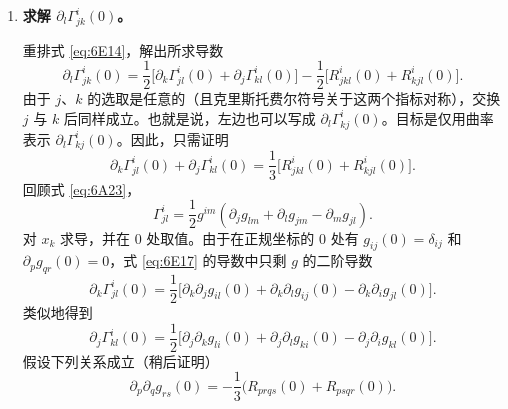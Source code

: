 \begin{enumerate}
由于克里斯托费尔符号关于下指标对称，即 $\Gamma^i_{jk}=\Gamma^i_{kj}$，它们对任一坐标的导数也对称
\[
  \partial_l\Gamma^i_{jk}(0)=\partial_l\Gamma^i_{kj}(0).
\]
因此式 \eqref{eq:6E13} 化为
\begin{equation*}
  R^i_{jkl}(0)+R^i_{kjl}(0)
   =\partial_k\Gamma^i_{jl}(0)+\partial_j\Gamma^i_{kl}(0)-2\partial_l\Gamma^i_{jk}(0).
  \tag{6E14}\label{eq:6E14}
\end{equation*}
\item \textbf{求解 $\partial_l\Gamma^i_{jk}(0)$。}

重排式 \eqref{eq:6E14}，解出所求导数
\begin{equation*}
  \partial_l\Gamma^i_{jk}(0)
   =\frac12\bigl[\partial_k\Gamma^i_{jl}(0)+\partial_j\Gamma^i_{kl}(0)\bigr]
      -\frac12\bigl[R^i_{jkl}(0)+R^i_{kjl}(0)\bigr].
  \tag{6E15}\label{eq:6E15}
\end{equation*}
由于 $j$、$k$ 的选取是任意的（且克里斯托费尔符号关于这两个指标对称），交换 $j$ 与 $k$ 后同样成立。也就是说，左边也可以写成 $\partial_l\Gamma^i_{kj}(0)$。目标是仅用曲率表示 $\partial_l\Gamma^i_{kj}(0)$。因此，只需证明
\begin{equation*}
  \partial_k\Gamma^i_{jl}(0)+\partial_j\Gamma^i_{kl}(0)
    =\frac13\bigl[R^i_{jkl}(0)+R^i_{kjl}(0)\bigr].
  \tag{6E16}\label{eq:6E16}
\end{equation*}
回顾式 \eqref{eq:6A23}，
\begin{equation*}
  \Gamma^i_{jl}=\frac12g^{im}(\partial_jg_{lm}+\partial_lg_{jm}-\partial_mg_{jl}).
  \tag{6E17}\label{eq:6E17}
\end{equation*}
对 $x_k$ 求导，并在 0 处取值。由于在正规坐标的 0 处有 $g_{ij}(0)=\delta_{ij}$ 和 $\partial_pg_{qr}(0)=0$，式 \eqref{eq:6E17} 的导数中只剩 $g$ 的二阶导数
\begin{equation*}
  \partial_k\Gamma^i_{jl}(0)=\frac12\bigl[\partial_k\partial_jg_{il}(0)
             +\partial_k\partial_lg_{ij}(0)-\partial_k\partial_i g_{jl}(0)\bigr].
  \tag{6E18}\label{eq:6E18}
\end{equation*}
类似地得到
\begin{equation*}
  \partial_j\Gamma^i_{kl}(0)=\frac12\bigl[\partial_j\partial_kg_{li}(0)
             +\partial_j\partial_lg_{ki}(0)-\partial_j\partial_i g_{kl}(0)\bigr].
  \tag{6E19}\label{eq:6E19}
\end{equation*}
假设下列关系成立（稍后证明）
\begin{equation*}
  \partial_p\partial_qg_{rs}(0)=-\frac13\bigl(R_{prqs}(0)+R_{psqr}(0)\bigr).
  \tag{6E20}\label{eq:6E20}
\end{equation*}


\end{enumerate}
